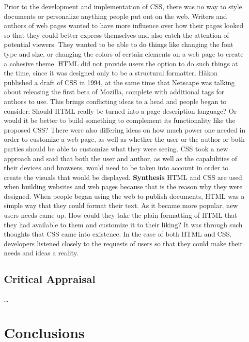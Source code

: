 \documentclass{article}
\theoremstyle{theorem}
\theoremstyle{definition}
\theoremstyle{remark}
\begin{document}
\newline\indent Prior to the development and implementation of CSS, there was no way to style documents or personalize anything people put out on the web. Writers and authors of web pages wanted to have more influence over how their pages looked so that they could better express themselves and also catch the attention of potential viewers. They wanted to be able to do things like changing the font type and size, or changing the colors of certain elements on a web page to create a cohesive theme. HTML did not provide users the option to do such things at the time, since it was designed only to be a structural formatter.
\newline\indent Håkon published a draft of CSS in 1994, at the same time that Netscape was talking about releasing the first beta of Mozilla, complete with additional tags for authors to use. This brings conflicting ideas to a head and people began to consider: Should HTML really be turned into a page-description language? Or would it be better to build something to complement its functionality like the proposed CSS? There were also differing ideas on how much power one needed in order to customize a web page, as well as whether the user or the author or both parties should be able to customize what they were seeing. CSS took a new approach and said that both the user and author, as well as the capabilities of their devices and browsers, would need to be taken into account in order to create the visuals that would be displayed.\newline\newline
\noindent\textbf{Synthesis}
\newline\indent HTML and CSS are used when building websites and web pages because that is the reason why they were designed. When people began using the web to publish documents, HTML was a simple way that they could format their text. As it became more popular, new users needs came up. How could they take the plain formatting of HTML that they had available to them and customize it to their liking? It was through such thoughts that CSS came into existence. In the case of both HTML and CSS, developers listened closely to the requests of users so that they could make their needs and ideas a reality.
\subsection{Critical Appraisal}

\ldots

\section{Conclusions}\label{conclusions}
\end{document}
